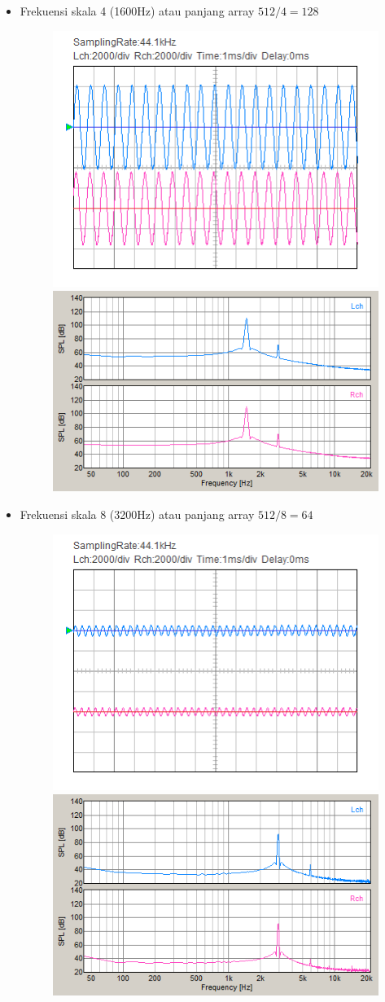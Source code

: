 \documentclass[12pt,]{article}
\begin{document}
\begin{itemize}
\begin{itemize}
			\item Frekuensi skala 4 (1600Hz) atau panjang array $512/4=128$
			\begin{figure}[H]
				\centering
				\includegraphics[width=0.45\linewidth]{result/day_4/osi_sine4}
				\includegraphics[width=0.45\linewidth]{result/day_4/fft_sine4}
			\end{figure}
		
			\newpage
			\item Frekuensi skala 8 (3200Hz) atau panjang array $512/8=64$
			\begin{figure}[H]
				\centering
				\includegraphics[width=0.45\linewidth]{result/day_4/osi_sine8}
				\includegraphics[width=0.45\linewidth]{result/day_4/fft_sine8}
			\end{figure}
		

\end{itemize}
\end{itemize}
\end{document}
